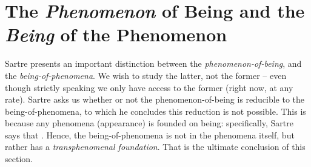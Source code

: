 \section{The \emph{Phenomenon} of Being and the \\ \emph{Being} of the Phenomenon}

Sartre presents an important distinction between the \emph{phenomenon-of-being}, and the \emph{being-of-phenomena}. We wish to study the latter, not the former -- even though strictly speaking we only have access to the former (right now, at any rate). Sartre asks us whether or not the phenomenon-of-being is reducible to the being-of-phenomena, to which he concludes this reduction is not possible. This is because any phenomena (appearance) is founded on being: specifically, Sartre says that .
Hence, the being-of-phenomena is not in the phenomena itself, but rather has a \emph{transphenomenal foundation}. That is the ultimate conclusion of this section.

